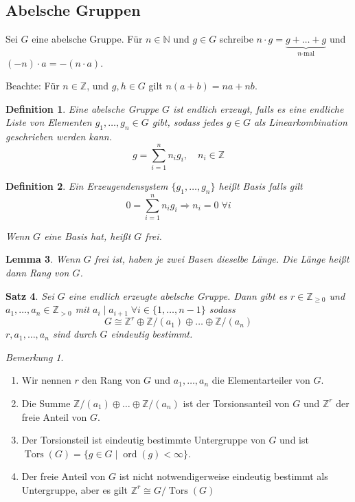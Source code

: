 \documentclass[a4paper,12pt,numbers=noenddot,parskip=full]{scrartcl}
\newcommand{\setN}{\mathbb{N}}
\newcommand{\setZ}{\mathbb{Z}}
\theoremstyle{dotless}
\newtheorem{theorem}{Satz}[section]
\newtheorem{lemma}[theorem]{Lemma}
\newtheorem{definition}[theorem]{Definition}
\theoremstyle{remark}
\newtheorem*{remark}{Bemerkung}
\begin{document}
	\subsection{Abelsche Gruppen}
	
	Sei $G$ eine abelsche Gruppe. Für $n \in \setN$ und $g \in G$ schreibe $n \cdot g = \underbrace{g + \dots + g}_{\text{$n$-mal}}$ und $(-n) \cdot a = -(n \cdot a)$.
	
	Beachte: Für $n \in \setZ$, und $g,h \in G$ gilt $n(a + b) = n a + n b$.
	
	\begin{definition}
		Eine abelsche Gruppe $G$ ist endlich erzeugt, falls es eine endliche Liste von Elementen $g_1, \dots, g_n \in G$ gibt, sodass jedes $g \in G$ als Linearkombination geschrieben werden kann.
		\begin{equation*}
			g = \sum_{i = 1}^n n_i g_i, \quad n_i \in \setZ
		\end{equation*}
	\end{definition}

	\begin{definition}
		Ein Erzeugendensystem $\{ g_1, \dots, g_n \}$ heißt Basis falls gilt
		\begin{equation*}
			0 = \sum_{i = 1}^n n_i g_i \Rightarrow n_i = 0 \; \forall i
		\end{equation*}
		
		Wenn $G$ eine Basis hat, heißt $G$ frei.
	\end{definition}

	\begin{lemma}
		Wenn $G$ frei ist, haben je zwei Basen dieselbe Länge. Die Länge heißt dann Rang von $G$.
	\end{lemma}

	\begin{theorem}
		Sei $G$ eine endlich erzeugte abelsche Gruppe. Dann gibt es $r \in \setZ_{\geq 0}$ und $a_1, \dots, a_n \in \setZ_{>0}$ mit $a_i \mid a_{i+1} \; \forall i \in \{ 1, \dots, n-1 \}$ sodass
		\begin{equation*}
			G \cong \setZ^r \oplus \setZ/(a_1) \oplus \dots \oplus \setZ/(a_n)
		\end{equation*}
		$r, a_1, \dots, a_n$ sind durch $G$ eindeutig bestimmt.
	\end{theorem}

	\begin{remark}
		\begin{enumerate}
			\item Wir nennen $r$ den Rang von $G$ und $a_1, \dots, a_n$ die Elementarteiler von $G$.
			\item Die Summe $\setZ/(a_1) \oplus \dots \oplus \setZ/(a_n)$ ist der Torsionsanteil von $G$ und $\setZ^r$ der freie Anteil von $G$.
			\item Der Torsionsteil ist eindeutig bestimmte Untergruppe von $G$ und ist $\operatorname{Tors}(G) = \{ g \in G \mid \operatorname{ord}(g) < \infty \}$.
			\item Der freie Anteil von $G$ ist nicht notwendigerweise eindeutig bestimmt als Untergruppe, aber es gilt $\setZ^r \cong G/\operatorname{Tors}(G)$
		\end{enumerate}
	\end{remark}
\end{document}
